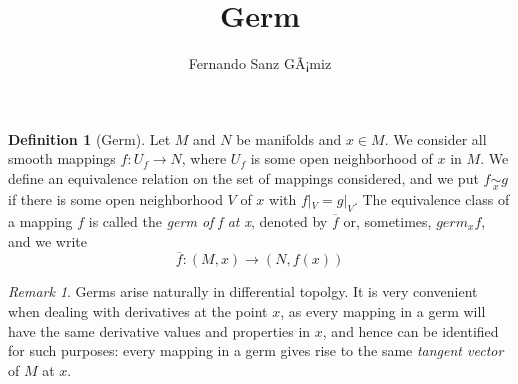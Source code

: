 \documentclass[12pt]{article}
\theoremstyle{definition}
\newtheorem{defn}{Definition}
\theoremstyle{remark}
\newtheorem{rem}{Remark}
\numberwithin{equation}{section}
\begin{document}
\title{Germ}%
\author{Fernando Sanz GÃ¡miz}%

\begin{defn}[Germ]
Let $M$ and $N$ be manifolds and $x \in M$. We consider all smooth
mappings $f: U_f \to N$, where $U_f$ is some open neighborhood of
$x$ in $M$. We define an equivalence relation on the set of mappings
considered, and we put $f \underset{x}{\sim} g$ if there is some
open neighborhood $V$ of $x$ with $f|_V = g|_V$. The equivalence
class of a mapping $f$ is called the \emph{germ of f at x}, denoted
by $\overline{f}$ or, sometimes, $germ_x f$, and we write
$$\overline{f}:(M,x) \to (N,f(x))$$
\end{defn}

\bigskip

\begin{rem}
Germs arise naturally in differential topolgy. It is very convenient
when dealing with derivatives at the point $x$, as every mapping in
a germ will have the same derivative values and properties in $x$,
and hence can be identified for such purposes: every mapping in a
germ gives rise to the same \emph{tangent vector} of $M$ at $x$.
\end{rem}
\end{document}
